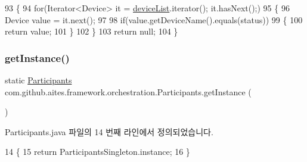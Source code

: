 \begin{DoxyCode}
93                                                     \{
94         \textcolor{keywordflow}{for}(Iterator<Device> it = \mbox{\hyperlink{classcom_1_1github_1_1aites_1_1framework_1_1orchestration_1_1_participants_ab90ca1b5cf16aec6e3e6608df4a8d2ad}{deviceList}}.iterator(); it.hasNext();)
95         \{
96             Device value = it.next();
97             
98             \textcolor{keywordflow}{if}(value.getDeviceName().equals(status))
99             \{
100                 \textcolor{keywordflow}{return} value;
101             \}
102         \}
103         \textcolor{keywordflow}{return} null;
104     \}
\end{DoxyCode}
\mbox{\label{classcom_1_1github_1_1aites_1_1framework_1_1orchestration_1_1_participants_ac4bbc6cb9dbf0d9637754b1276d7e8c0}} 
\subsubsection{\texorpdfstring{get\+Instance()}{getInstance()}}
{\footnotesize\ttfamily static \mbox{\hyperlink{classcom_1_1github_1_1aites_1_1framework_1_1orchestration_1_1_participants}{Participants}} com.\+github.\+aites.\+framework.\+orchestration.\+Participants.\+get\+Instance (\begin{DoxyParamCaption}{ }\end{DoxyParamCaption})\hspace{0.3cm}{\ttfamily [static]}}



Participants.\+java 파일의 14 번째 라인에서 정의되었습니다.


\begin{DoxyCode}
14                                             \{
15         \textcolor{keywordflow}{return} ParticipantsSingleton.instance;
16     \}
\end{DoxyCode}
\mbox{\label{classcom_1_1github_1_1aites_1_1framework_1_1orchestration_1_1_participants_ad8cff5b48970cc4ca491545e09a94047}} 
